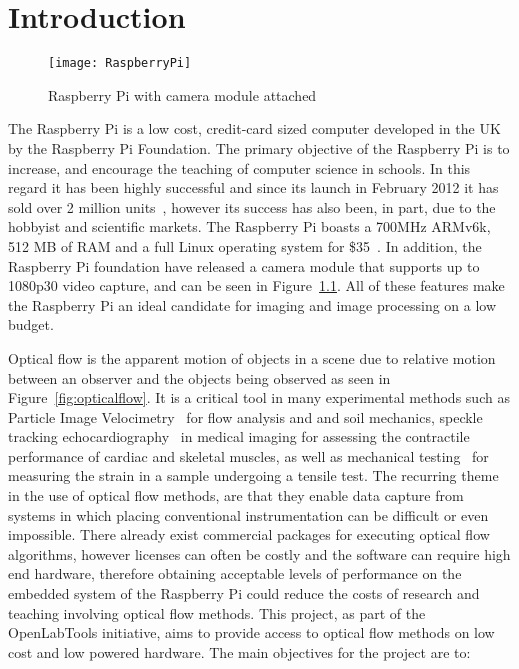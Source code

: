 \chapter{Introduction}

\ifpdf
    \graphicspath{{Section1/Figs/Raster/}{Section1/Figs/PDF/}{Section1/Figs/}}
\else
    \graphicspath{{Section1/Figs/Vector/}{Section1/Figs/}}
\fi

\begin{figure}[htpb]
  \centering
  \texttt{[image: RaspberryPi]}
  \caption{Raspberry Pi with camera module attached}
  \label{fig:raspi}
\end{figure}

The Raspberry Pi is a low cost, credit-card sized computer developed in the UK by the Raspberry Pi Foundation. The primary objective of the Raspberry Pi is to increase, and encourage the teaching of computer science in schools. In this regard it has been highly successful and since its launch in February 2012 it has sold over 2 million units~\cite{2mil}, however its success has also been, in part, due to the hobbyist and scientific markets. The Raspberry Pi boasts a 700MHz ARMv6k, 512 MB of RAM and a full Linux operating system for \$35~\cite{Broadcom-BCM2835-Website}. In addition, the Raspberry Pi foundation have released a camera module that supports up to 1080p30 video capture, and can be seen in Figure~\ref{fig:raspi}. All of these features make the Raspberry Pi an ideal candidate for imaging and image processing on a low budget.

Optical flow is the apparent motion of objects in a scene due to relative motion between an observer and the objects being observed as seen in Figure~\ref{fig:opticalflow}. It is a critical tool in many experimental methods such as Particle Image Velocimetry~\cite{quenot1998particle} for flow analysis and and soil mechanics, speckle tracking echocardiography~\cite{speckle} in medical imaging for assessing the contractile performance of cardiac and skeletal muscles, as well as mechanical testing~\cite{harris2012characterizing} for measuring the strain in a sample undergoing a tensile test. The recurring theme in the use of optical flow methods, are that they enable data capture from systems in which placing conventional instrumentation can be difficult or even impossible. There already exist commercial packages for executing optical flow algorithms, however licenses can often be costly and the software can require high end hardware, therefore obtaining acceptable levels of performance on the embedded system of the Raspberry Pi could reduce the costs of research and teaching involving optical flow methods. This project, as part of the OpenLabTools initiative, aims to provide access to optical flow methods on low cost and low powered hardware. The main objectives for the project are to:

